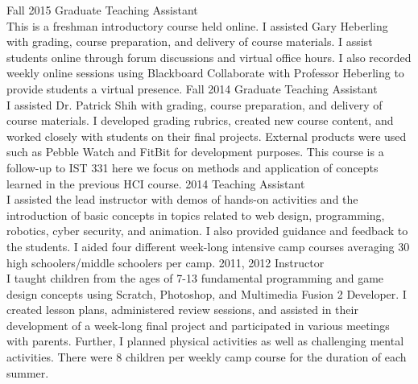 \documentclass[]{cv-style}          %
\begin{document}
\begin{entrylist}
\entry
  {Fall 2015}
  {Graduate Teaching Assistant}
  {}
  {\\ 
  This is a freshman introductory course held online. I assisted Gary Heberling with grading, course preparation, and delivery of course materials. I assist students online through forum discussions and virtual office hours. I also recorded weekly online sessions using Blackboard Collaborate with Professor Heberling to provide students a virtual presence. 
  }
\entry
  {Fall 2014}
  {Graduate Teaching Assistant}
  {}
  {\\ 
  I assisted Dr. Patrick Shih with grading, course preparation, and delivery of course materials. I developed grading rubrics, created new course content, and worked closely with students on their final projects. External products were used such as Pebble Watch and FitBit for development purposes. This course is a follow-up to IST 331 here we focus on methods and application of concepts learned in the previous HCI course. 
  }
\entry
  {2014}
  {Teaching Assistant}
  {}
  {\\ 
  I assisted the lead instructor with demos of hands-on activities and the introduction of basic concepts in topics related to web design, programming, robotics, cyber security, and animation. I also provided guidance and feedback to the students. I aided four different week-long intensive camp courses averaging 30 high schoolers/middle schoolers per camp. 
  }
\entry
  {2011, 2012}
  {Instructor}
  {}
  {\\
  I taught children from the ages of 7-13 fundamental programming and game design concepts using Scratch, Photoshop, and Multimedia Fusion 2 Developer. I created lesson plans, administered review sessions, and assisted in their development of a week-long final project and participated in various meetings with parents. Further, I planned physical activities as well as challenging mental activities. There were 8 children per weekly camp course for the duration of each summer.}
\end{entrylist}
  
\end{document}

